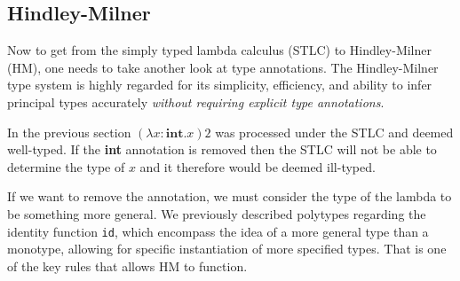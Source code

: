 \documentclass{l4proj}
\begin{document}




\subsection{Hindley-Milner}
\label{sec:hindley-milner}



Now to get from the simply typed lambda calculus (STLC) to Hindley-Milner (HM), one needs to take another look at type annotations.
The Hindley-Milner type system is highly regarded for its simplicity, efficiency, and ability to infer principal types accurately \emph{without requiring explicit type annotations}.

In the previous section $(\lambda x:\textbf{int}. x) 2$ was processed under the STLC and deemed well-typed.
If the \textbf{int} annotation is removed then the STLC will not be able to determine the type of $x$ and it therefore would be deemed ill-typed.

If we want to remove the annotation, we must consider the type of the lambda to be something more general.
We previously described polytypes regarding the identity function \texttt{id}, which encompass the idea of a more general type than a monotype, allowing for specific instantiation of more specified types.
That is one of the key rules that allows HM to function.
\end{document}
